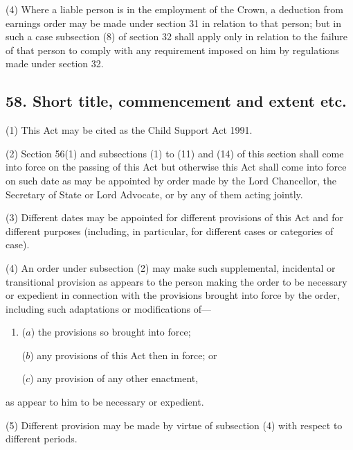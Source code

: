 \documentclass[a4paper]{article}
\begin{document}
(4)
Where a liable person is in the employment of the Crown, a deduction from earnings order may be made under section 31 in relation to that person; but in such a case subsection (8) of section 32 shall apply only in relation to the failure of that person to comply with any requirement imposed on him by regulations made under section 32.


\subsection{58. Short title, commencement and extent etc.}

(1) This Act may be cited as the Child Support Act 1991.

(2)
Section 56(1) and subsections (1) to (11) and (14) of this section shall come into force on the passing of this Act but otherwise this Act shall come into force on such date as may be appointed by order made by the Lord Chancellor, the Secretary of State or Lord Advocate, or by any of them acting jointly.

(3)
Different dates may be appointed for different provisions of this Act and for different purposes (including, in particular, for different cases or categories of case).

(4)
An order under subsection (2) may make such supplemental, incidental or transitional provision as appears to the person making the order to be necessary or expedient in connection with the provisions brought into force by the order, including such adaptations or modifications of---
\begin{enumerate}\item[]
($a$) the provisions so brought into force;

($b$) any provisions of this Act then in force; or

($c$)
any provision of any other enactment, 
\end{enumerate}
as appear to him to be necessary or expedient.

(5)
Different provision may be made by virtue of subsection (4) with respect to different periods.
\end{document}
